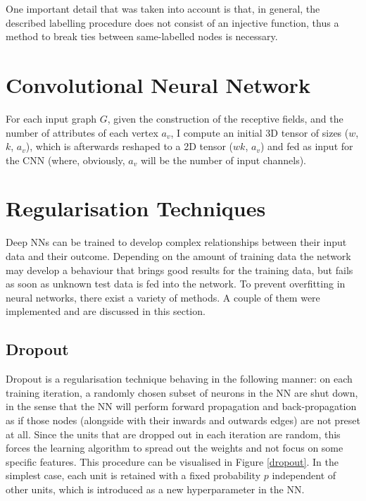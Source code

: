 One important detail that was taken into account is that, in general, the described labelling procedure does not consist of an injective function, thus a method to break ties between same-labelled nodes is necessary.

\section{Convolutional Neural Network}

For each input graph $G$, given the construction of the receptive fields, and the number of attributes of each vertex $a_v$, I compute an initial 3D tensor of sizes ($w$, $k$, $a_v$), which is afterwards reshaped to a 2D tensor ($wk$, $a_v$) and fed as input for the CNN (where, obviously, $a_v$ will be the number of input channels). \\

\section{Regularisation Techniques}

Deep NNs can be trained to develop complex relationships between their input data and their outcome. Depending on the amount of training data the network may develop a behaviour that brings good results for the training data, but fails as soon as unknown test data is fed into the network. To prevent overfitting in neural networks, there exist a variety of methods. A couple of them were implemented and are discussed in this section.

\subsection{Dropout}

Dropout is a regularisation technique behaving in the following manner: on each training iteration, a randomly chosen subset of neurons in the NN are shut down, in the sense that the NN will perform forward propagation and back-propagation as if those nodes (alongside with their inwards and outwards edges) are not preset at all. Since the units that are dropped out in each iteration are random, this forces the learning algorithm to spread out the weights and not focus on some specific features. This procedure can be visualised in Figure \ref{dropout}. In the simplest case, each unit is retained with a fixed probability $p$ independent of other units, which is introduced as a new hyperparameter in the NN. \\

